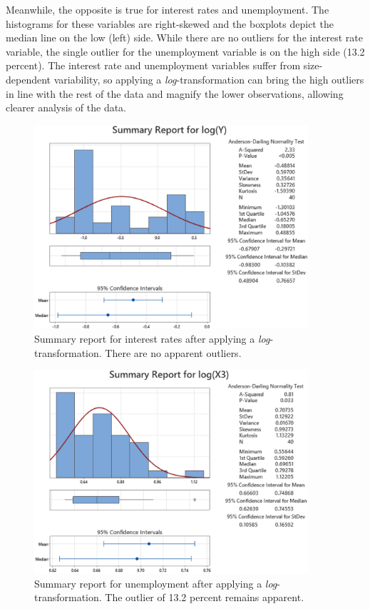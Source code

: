 \documentclass[12pt]{article}
\begin{document}
Meanwhile, the opposite is true for interest rates and unemployment. The histograms for these variables are right-skewed and the boxplots depict the median line on the low (left) side. While there are no outliers for the interest rate variable, the single outlier for the unemployment variable is on the high side (13.2 percent). The interest rate and unemployment variables suffer from size-dependent variability, so applying a \textit{log}-transformation can bring the high outliers in line with the rest of the data and magnify the lower observations, allowing clearer analysis of the data. 
\begin{figure}
\begin{center}
\includegraphics[width=4in]{images/log-interest-rate-summary.png}
\end{center}
\caption{Summary report for interest rates after applying a \textit{log}-transformation. There are no apparent outliers.\label{fig:loginterestratesummary}}
\end{figure}
\begin{figure}
\begin{center}
\includegraphics[width=4in]{images/log-unemployment-summary.png}
\end{center}
\caption{Summary report for unemployment after applying a \textit{log}-transformation. The outlier of 13.2 percent remains apparent.\label{fig:logunemploymentsummary}}
\end{figure}
\end{document}
